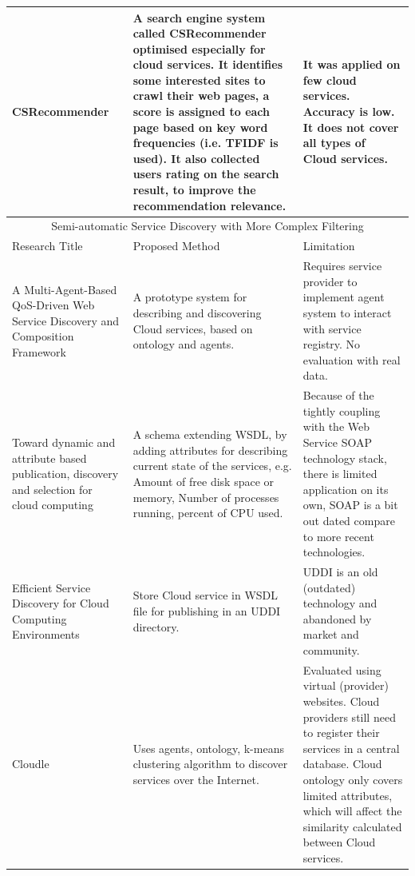 \begin{longtable}{ p{30mm} | p{50mm} | p{50mm} }
\hline
	CSRecommender \cite{CSRecommender}&
    A search engine system called CSRecommender optimised especially for cloud services. It identifies some interested sites to crawl their web pages,
    a score is assigned to each page based on key word frequencies (i.e. TFIDF is used). It also collected users rating on the search result, to improve the recommendation relevance.&
    It was applied on few cloud services. Accuracy is low. It does not cover all types of Cloud services.\\
\hline
\multicolumn{3}{c}{\cellcolor{yellow} Semi-automatic Service Discovery with More Complex Filtering}\\
\hline
Research Title & Proposed Method & Limitation \\
\hline
    A Multi-Agent-Based QoS-Driven Web Service Discovery and Composition Framework \cite{Multi-agent-BasedCloudDescriptionDiscoveryOntology}&
    A prototype system for describing and discovering Cloud services, based on ontology and agents.&
    Requires service provider to implement agent system to interact with service registry. No evaluation with real data.\\
\hline
	Toward dynamic and attribute based publication, discovery and selection for cloud computing \cite{DynamicAttributeBasedPublicationDiscoverySelectionForCloud} &
    A schema extending WSDL, by adding attributes for describing current state of the services, e.g. Amount of free disk space or memory, Number of processes running, percent of CPU used. &
    Because of the tightly coupling with the Web Service SOAP technology stack, there is limited application on its own, SOAP is a bit out dated compare to more recent technologies. \\
\hline   
    Efficient Service Discovery for Cloud Computing Environments
    \cite{EfficientServiceDiscoveryforCloudComputingEnvironments} & 
    Store Cloud service in WSDL file for publishing in an UDDI directory.& 
    UDDI is an old (outdated) technology and abandoned by market and community.\\ 
\hline
	Cloudle \cite{Cloudle, CloudleAgent-BasedCloudComputing} & 
    Uses agents, ontology, k-means clustering algorithm to discover services over the Internet. & 
    Evaluated using virtual (provider) websites. 
    Cloud providers still need to register their services in a central database.
    Cloud ontology only covers limited attributes,
    which will affect the similarity calculated between Cloud services.\\ 

\end{longtable}
